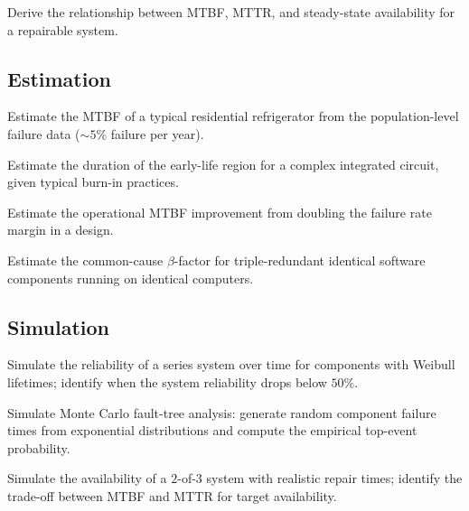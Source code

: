 \begin{exercise}
Derive the relationship between MTBF, MTTR, and steady-state availability for a repairable system.
\end{exercise}

\subsection*{Estimation}

\begin{exercise}
Estimate the MTBF of a typical residential refrigerator from the population-level failure data ($\sim 5\%$ failure per year).
\end{exercise}

\begin{exercise}
Estimate the duration of the early-life region for a complex integrated circuit, given typical burn-in practices.
\end{exercise}

\begin{exercise}
Estimate the operational MTBF improvement from doubling the failure rate margin in a design.
\end{exercise}

\begin{exercise}
Estimate the common-cause $\beta$-factor for triple-redundant identical software components running on identical computers.
\end{exercise}

\subsection*{Simulation}

\begin{exercise}
Simulate the reliability of a series system over time for components with Weibull lifetimes; identify when the system reliability drops below $50\%$.
\end{exercise}

\begin{exercise}
Simulate Monte Carlo fault-tree analysis: generate random component failure times from exponential distributions and compute the empirical top-event probability.
\end{exercise}

\begin{exercise}
Simulate the availability of a $2$-of-$3$ system with realistic repair times; identify the trade-off between MTBF and MTTR for target availability.
\end{exercise}

